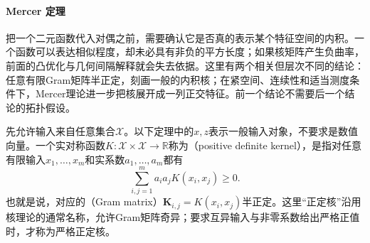 \paragraph{Mercer 定理}
\label{sec:classification-svm-mercer}

把一个二元函数代入对偶之前，需要确认它是否真的表示某个特征空间的内积。一个函数可以表达相似程度，却未必具有非负的平方长度；如果核矩阵产生负曲率，前面的凸优化与几何间隔解释就会失去依据。这里有两个相关但层次不同的结论：任意有限Gram矩阵半正定，刻画一般的内积核；在紧空间、连续性和适当测度条件下，Mercer理论进一步把核展开成一列正交特征。前一个结论不需要后一个结论的拓扑假设。

先允许输入来自任意集合$\mathcal{X}$。以下定理中的$x,z$表示一般输入对象，不要求是数值向量。一个实对称函数$K:\mathcal{X}\times\mathcal{X}\to\mathbb{R}$称为（positive definite kernel），是指对任意有限输入$x_1,\ldots,x_m$和实系数$a_1,\ldots,a_m$都有
\[
  \sum_{i,j=1}^m a_i a_j K(x_i,x_j)\ge0.
\]
也就是说，对应的（Gram matrix）$\bm{K}_{i,j}=K(x_i,x_j)$半正定。这里“正定核”沿用核理论的通常名称，允许Gram矩阵奇异；要求互异输入与非零系数给出严格正值时，才称为严格正定核。

